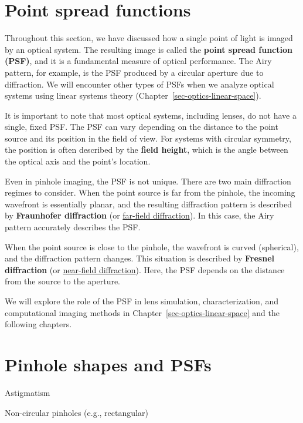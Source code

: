 \documentclass[
  letterpaper,
]{book}
\begin{document}
\section{Point spread functions}\label{sec-pointspread}

Throughout this section, we have discussed how a single point of light
is imaged by an optical system. The resulting image is called the
\textbf{point spread function (PSF)}, and it is a fundamental measure of
optical performance. The Airy pattern, for example, is the PSF produced
by a circular aperture due to diffraction. We will encounter other types
of PSFs when we analyze optical systems using linear systems theory
(Chapter~\ref{sec-optics-linear-space}).

It is important to note that most optical systems, including lenses, do
not have a single, fixed PSF. The PSF can vary depending on the distance
to the point source and its position in the field of view. For systems
with circular symmetry, the position is often described by the
\textbf{field height}, which is the angle between the optical axis and
the point's location.

Even in pinhole imaging, the PSF is not unique. There are two main
diffraction regimes to consider. When the point source is far from the
pinhole, the incoming wavefront is essentially planar, and the resulting
diffraction pattern is described by \textbf{Fraunhofer diffraction} (or
\href{https://en.wikipedia.org/wiki/Fraunhofer_diffraction}{far-field
diffraction}). In this case, the Airy pattern accurately describes the
PSF.

When the point source is close to the pinhole, the wavefront is curved
(spherical), and the diffraction pattern changes. This situation is
described by \textbf{Fresnel diffraction} (or
\href{https://en.wikipedia.org/wiki/Fresnel_diffraction}{near-field
diffraction}). Here, the PSF depends on the distance from the source to
the aperture.

We will explore the role of the PSF in lens simulation,
characterization, and computational imaging methods in
Chapter~\ref{sec-optics-linear-space} and the following chapters.

\section{Pinhole shapes and PSFs}\label{pinhole-shapes-and-psfs}

Astigmatism

Non-circular pinholes (e.g., rectangular)
\end{document}

